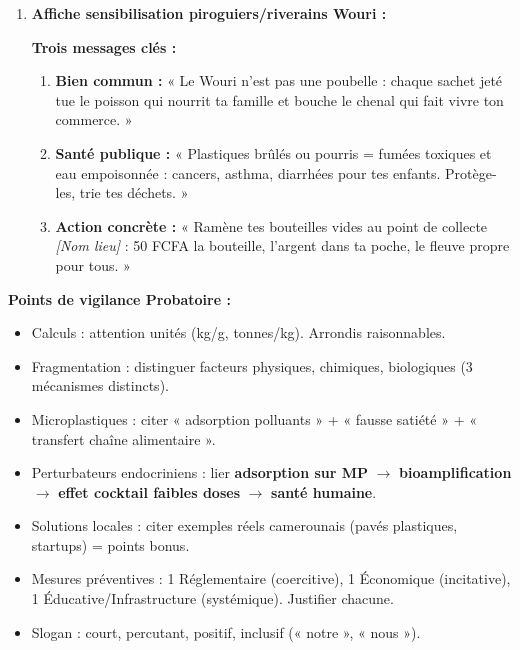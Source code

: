 \documentclass[11pt]{article}
\begin{document}
\begin{corrige}
\begin{enumerate}
\begin{enumerate}
\begin{enumerate}
        \end{enumerate}
        \item \textbf{Affiche sensibilisation piroguiers/riverains Wouri :}
        \begin{center}
        \end{center}
        \textbf{Trois messages clés :}
        \begin{enumerate}
            \item \textbf{Bien commun :} « Le Wouri n'est pas une poubelle : chaque sachet jeté tue le poisson qui nourrit ta famille et bouche le chenal qui fait vivre ton commerce. »
            \item \textbf{Santé publique :} « Plastiques brûlés ou pourris = fumées toxiques et eau empoisonnée : cancers, asthma, diarrhées pour tes enfants. Protège-les, trie tes déchets. »
            \item \textbf{Action concrète :} « Ramène tes bouteilles vides au point de collecte \textit{[Nom lieu]} : 50 FCFA la bouteille, l'argent dans ta poche, le fleuve propre pour tous. »
        \end{enumerate}
    \end{enumerate}
\end{enumerate}
\textbf{Points de vigilance Probatoire :}
\begin{itemize}
    \item Calculs : attention unités (kg/g, tonnes/kg). Arrondis raisonnables.
    \item Fragmentation : distinguer facteurs physiques, chimiques, biologiques (3 mécanismes distincts).
    \item Microplastiques : citer « adsorption polluants » + « fausse satiété » + « transfert chaîne alimentaire ».
    \item Perturbateurs endocriniens : lier \textbf{adsorption sur MP} $\rightarrow$ \textbf{bioamplification} $\rightarrow$ \textbf{effet cocktail faibles doses} $\rightarrow$ \textbf{santé humaine}.
    \item Solutions locales : citer exemples réels camerounais (pavés plastiques, startups) = points bonus.
    \item Mesures préventives : 1 Réglementaire (coercitive), 1 Économique (incitative), 1 Éducative/Infrastructure (systémique). Justifier chacune.
    \item Slogan : court, percutant, positif, inclusif (« notre », « nous »).
\end{itemize}
\end{corrige}
\end{document}
